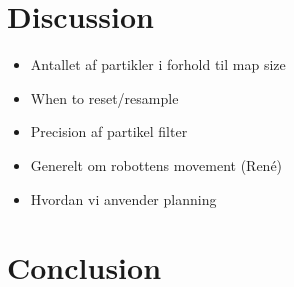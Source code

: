 \chapter{Discussion}
\begin{itemize}
\item Antallet af partikler i forhold til map size
\item When to reset/resample
\item Precision af partikel filter
\item Generelt om robottens movement (René)
\item Hvordan vi anvender planning
\end{itemize}

\chapter{Conclusion}
